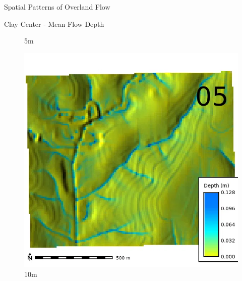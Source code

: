 \documentclass[
  ignorenonframetext,
]{beamer}
\begin{document}
\begin{frame}{Spatial Patterns of Overland Flow}
\begin{block}{Clay Center - Mean Flow Depth}
\begin{figure}[H]
{}

\caption{5m}

\end{figure}%

\begin{figure}[H]

{\centering \includegraphics{../output/clay-center/sensitivity_1/clay-center_depth_10_4_s_average.webp}

}

\caption{10m}

\end{figure}%

\begin{figure}[H]


\end{figure}
\end{block}
\end{frame}
\end{document}
